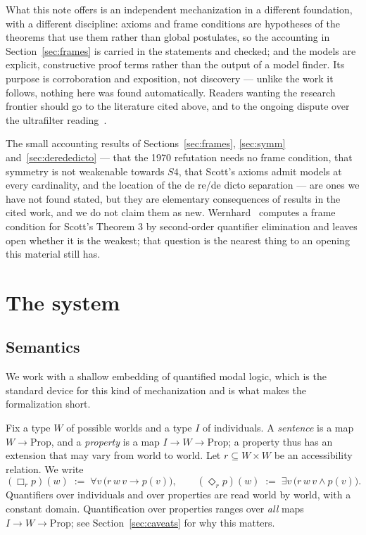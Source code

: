 \documentclass[11pt]{article}
\theoremstyle{plain}
\theoremstyle{definition}
\newcommand{\Prp}{\mathrm{Prop}}
\begin{document}
What this note offers is an independent mechanization in a different
foundation, with a different discipline: axioms and frame conditions are
hypotheses of the theorems that use them rather than global postulates, so the
accounting in Section~\ref{sec:frames} is carried in the statements and
checked; and the models are explicit, constructive proof terms rather than the
output of a model finder. Its purpose is corroboration and exposition, not
discovery --- unlike the work it follows, nothing here was found
automatically. Readers wanting the research frontier should go to the
literature cited above, and to the ongoing dispute over the ultrafilter
reading~\cite{og2026,benz2026}.

The small accounting results of Sections~\ref{sec:frames}, \ref{sec:symm}
and~\ref{sec:derededicto} --- that the 1970 refutation needs no frame
condition, that symmetry is not weakenable towards $S4$, that Scott's axioms
admit models at every cardinality, and the location of the de re/de dicto
separation --- are ones we have not found stated, but they are elementary
consequences of results in the cited work, and we do not claim them as new.
Wernhard~\cite{wernhard} computes a frame condition for Scott's Theorem 3 by
second-order quantifier elimination and leaves open whether it is the weakest;
that question is the nearest thing to an opening this material still has.

\section{The system}\label{sec:system}

\subsection{Semantics}

We work with a shallow embedding of quantified modal logic, which is the
standard device for this kind of mechanization and is what makes the
formalization short.

Fix a type $W$ of possible worlds and a type $I$ of individuals. A
\emph{sentence} is a map $W \to \Prp$, and a \emph{property} is a map
$I \to W \to \Prp$; a property thus has an extension that may vary from world
to world. Let $r \subseteq W \times W$ be an accessibility relation. We write
\[
  (\Box_r p)(w) \;:=\; \forall v\,\bigl(r\,w\,v \to p(v)\bigr),
  \qquad
  (\Diamond_r p)(w) \;:=\; \exists v\,\bigl(r\,w\,v \wedge p(v)\bigr).
\]
Quantifiers over individuals and over properties are read world by world, with
a constant domain. Quantification over properties ranges over \emph{all} maps
$I \to W \to \Prp$; see Section~\ref{sec:caveats} for why this matters.
\end{document}
